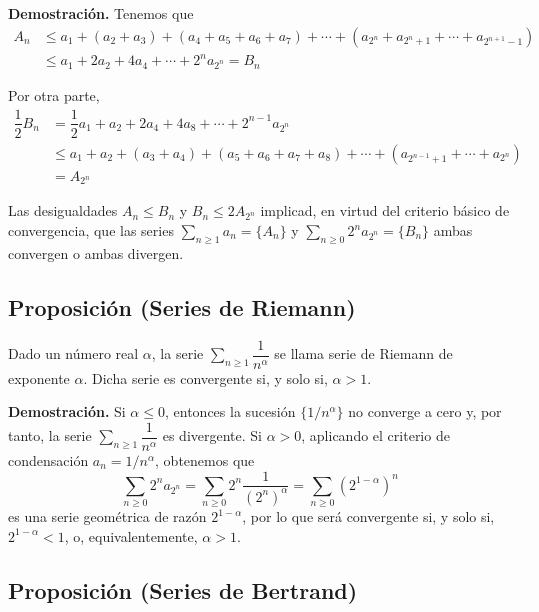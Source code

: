 \documentclass[10pt,a4paper]{article}
\begin{document}
	\textbf{Demostración.} Tenemos que 
	\begin{equation*}
		\begin{split}
			A_n & \leq a_1 + (a_2 + a_3) + (a_4 + a_5 + a_6 + a_7) + \cdots + (a_{2^n} + a_{2^n + 1} + \cdots + a_{2^{n+1} -1}) \\
			& \leq a_1 + 2a_2 + 4a_4 + \cdots + 2^n a_{2^n} = B_n
		\end{split}	
	\end{equation*}
	
	Por otra parte,
	\begin{equation*}
		\begin{split}
			\dfrac{1}{2} B_n & = \dfrac{1}{2} a_1 + a_2 + 2a_4 + 4 a_8 + \cdots + 2^{n-1}a_{2^n} \\
			& \leq a_1 + a_2 + (a_3 + a_4) + (a_5 + a_6 + a_7 + a_8) + \cdots + (a_{2^{n-1} + 1} + \cdots + a_{2^n}) \\
			& = A_{2^n}
		\end{split}
	\end{equation*}
	
	Las desigualdades $A_n \leq B_n$ y $B_n \leq 2A_{2^n}$ implicad, en virtud del criterio básico de convergencia, que las series $\displaystyle\sum_{n \geq 1}a_n = \{A_n\}$ y $\displaystyle\sum_{n \geq 0} 2^n a_{2^n} = \{B_n\}$ ambas convergen o ambas divergen.
	
	\subsection{Proposición (Series de Riemann)}
	
	Dado un número real $\alpha$, la serie $\displaystyle \sum_{n \geq 1} \dfrac{1}{n^\alpha}$ se llama serie de Riemann de exponente $\alpha$. Dicha serie es convergente si, y solo si, $\alpha > 1$.
	
	\textbf{Demostración. }Si $\alpha \leq 0$, entonces la sucesión $\{1/n^\alpha\}$ no converge a cero y, por tanto, la serie $\sum_{n \geq 1} \dfrac{1}{n^\alpha}$ es divergente. Si $\alpha > 0$, aplicando el criterio de condensación $a_n = 1/n^\alpha$, obtenemos que
	$$\sum_{n \geq 0} 2^n a_{2^n} = \sum_{n \geq 0}2^n \dfrac{1}{(2^n) ^\alpha} = \sum_{n \geq 0} (2^{1- \alpha})^n$$
	es una serie geométrica de razón $2 ^{1-\alpha}$, por lo que será convergente si, y solo si, $2 ^{1-\alpha} < 1$, o, equivalentemente, $\alpha > 1$.
	
	\subsection{Proposición (Series de Bertrand)}
	
\end{document}
